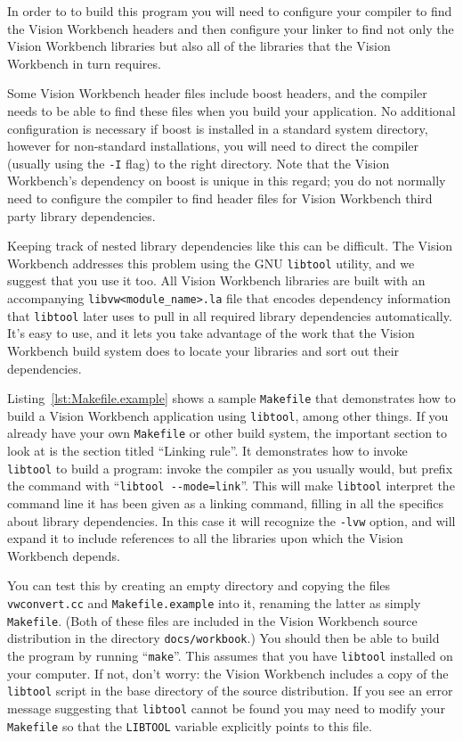In order to to build this program you will need to configure your
compiler to find the Vision Workbench headers and then configure your
linker to find not only the Vision Workbench libraries but also all of
the libraries that the Vision Workbench in turn requires.  

Some Vision Workbench header files include boost headers, and the
compiler needs to be able to find these files when you build your
application.  No additional configuration is necessary if boost is
installed in a standard system directory, however for non-standard
installations, you will need to direct the compiler (usually using the
\verb#-I# flag) to the right directory.  Note that the Vision
Workbench's dependency on boost is unique in this regard; you do not
normally need to configure the compiler to find header files for
Vision Workbench third party library dependencies.

Keeping track of nested library dependencies like this can be
difficult.  The Vision Workbench addresses this problem using the GNU
\verb#libtool# utility, and we suggest that you use it too.  All
Vision Workbench libraries are built with an accompanying
\verb#libvw<module_name>.la# file that encodes dependency information that
\verb#libtool# later uses to pull in all required library dependencies
automatically.  It's easy to use, and it lets you take advantage of
the work that the Vision Workbench build system does to locate your
libraries and sort out their dependencies.


Listing~\ref{lst:Makefile.example} shows a sample \verb#Makefile# 
that demonstrates how to build a Vision Workbench application using 
\verb#libtool#, among other things.  If you already have your own 
\verb#Makefile# or other build system, the important section to 
look at is the section titled ``Linking rule''.  It demonstrates 
how to invoke \verb#libtool# to build a program: invoke the compiler 
as you usually would, but prefix the command with 
``\verb#libtool --mode=link#''.  This will make \verb#libtool# 
interpret the command line it has been given as a linking command, 
filling in all the specifics about library dependencies.  In this 
case it will recognize the \verb#-lvw# option, and will expand it 
to include references to all the libraries upon which the Vision 
Workbench depends.

You can test this by creating an empty directory and copying the 
files \verb#vwconvert.cc# and \verb#Makefile.example# into it, 
renaming the latter as simply \verb#Makefile#.  (Both of these 
files are included in the Vision Workbench source distribution 
in the directory \verb#docs/workbook#.)  You should then 
be able to build the program by running ``\verb#make#''. 
This assumes that you have \verb#libtool# installed on your 
computer.  If not, don't worry: the Vision Workbench includes a 
copy of the \verb#libtool# script in the base directory of the 
source distribution.  If you see an error message suggesting that 
\verb#libtool# cannot be found you may need to modify your 
\verb#Makefile# so that the \verb#LIBTOOL# variable explicitly 
points to this file.


